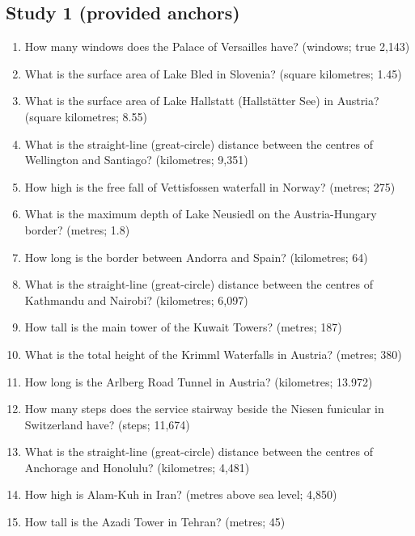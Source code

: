 \documentclass[11pt,a4paper]{article}
\begin{document}
\subsection*{Study 1 (provided anchors)}
\begin{enumerate}[label=\arabic*., itemsep=1pt]
  \item How many windows does the Palace of Versailles have? (windows; true 2,143)
  \item What is the surface area of Lake Bled in Slovenia? (square kilometres; 1.45)
  \item What is the surface area of Lake Hallstatt (Hallstätter See) in Austria? (square kilometres; 8.55)
  \item What is the straight-line (great-circle) distance between the centres of Wellington and Santiago? (kilometres; 9,351)
  \item How high is the free fall of Vettisfossen waterfall in Norway? (metres; 275)
  \item What is the maximum depth of Lake Neusiedl on the Austria-Hungary border? (metres; 1.8)
  \item How long is the border between Andorra and Spain? (kilometres; 64)
  \item What is the straight-line (great-circle) distance between the centres of Kathmandu and Nairobi? (kilometres; 6,097)
  \item How tall is the main tower of the Kuwait Towers? (metres; 187)
  \item What is the total height of the Krimml Waterfalls in Austria? (metres; 380)
  \item How long is the Arlberg Road Tunnel in Austria? (kilometres; 13.972)
  \item How many steps does the service stairway beside the Niesen funicular in Switzerland have? (steps; 11,674)
  \item What is the straight-line (great-circle) distance between the centres of Anchorage and Honolulu? (kilometres; 4,481)
  \item How high is Alam-Kuh in Iran? (metres above sea level; 4,850)
  \item How tall is the Azadi Tower in Tehran? (metres; 45)
\end{enumerate}
\end{document}
